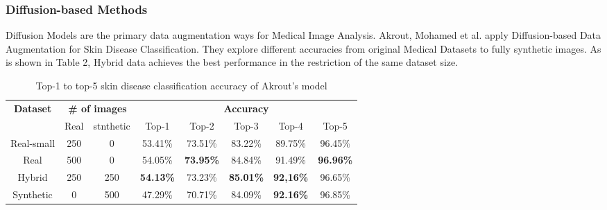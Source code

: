 \documentclass[preprint,12pt,authoryear]{elsarticle}
\begin{document}
\subsubsection{Diffusion-based Methods}
Diffusion Models are the primary data augmentation ways for Medical Image Analysis. Akrout, Mohamed et al. apply Diffusion-based Data Augmentation for Skin Disease Classification. They explore different accuracies from original Medical Datasets to fully synthetic images\cite{apl60}. As is shown in Table 2, Hybrid data achieves the best performance in the restriction of the same dataset size.
\renewcommand{\arraystretch}{1.5}
\begin{table}[]
\begin{tabular}{cccccccc}
\hline
\multirow{2}{*}{\textbf{Dataset}} & \multicolumn{2}{c}{\textbf{\# of images}} & \multicolumn{5}{c}{\textbf{Accuracy}}                                      \\ \cline{2-8} 
           & Real & stnthetic & Top-1   & Top-2            & Top-3   & Top-4            & Top-5            \\ \hline
Real-small & 250  & 0         & 53.41\% & 73.51\%          & 83.22\% & 89.75\%          & 96.45\%          \\ \hline
Real       & 500  & 0         & 54.05\% & \textbf{73.95\%} & 84.84\% & 91.49\%          & \textbf{96.96\%} \\ \hline
Hybrid                            & 250                 & 250                 & \textbf{54.13\%} & 73.23\% & \textbf{85.01\%} & \textbf{92,16\%} & 96.65\% \\ \hline
Synthetic  & 0    & 500       & 47.29\% & 70.71\%          & 84.09\% & \textbf{92.16\%} & 96.85\%          \\ \hline
\end{tabular}
\caption{Top-1 to top-5 skin disease classification accuracy of Akrout's model}
\end{table}
\end{document}

